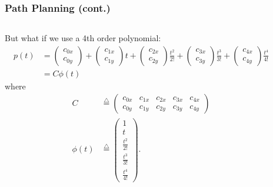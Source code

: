 \documentclass{beamer}
\newcommand{\defeq}{\stackrel{\triangle}{=}}
\begin{document}
\begin{frame}
\frametitle{Path Planning (cont.)}	
\begin{columns}
\begin{column}{0.8\textwidth}
	But what if we use a 4th order polynomial:
	\begin{align*}
   	p(t) &= \begin{pmatrix} c_{0x} \\ c_{0y} \end{pmatrix} + \begin{pmatrix} c_{1x} \\ c_{1y} \end{pmatrix} t + \begin{pmatrix} c_{2x} \\ c_{2y} \end{pmatrix} \frac{t^2}{2!} + \begin{pmatrix} c_{3x} \\ c_{3y} \end{pmatrix} \frac{t^3}{3!} + \begin{pmatrix} c_{4x} \\ c_{4y} \end{pmatrix} \frac{t^4}{4!} \\
   	   &= C \phi(t)
   \end{align*}
      where
   \begin{align*}
   C &\defeq	\begin{pmatrix} c_{0x} & c_{1x} & c_{2x} & c_{3x} & c_{4x} \\ c_{0y} & c_{1y} & c_{2y} & c_{3y} & c_{4y} \end{pmatrix}  \\
   \phi(t) &\defeq \begin{pmatrix} 1 \\ t \\  \frac{t^2}{2!} \\ \frac{t^3}{3!} \\ \frac{t^4}{4!} \end{pmatrix}.
   \end{align*}
\end{column}
\begin{column}{0.2\textwidth}  
\end{column}
\end{columns}
\end{frame}
\end{document}
